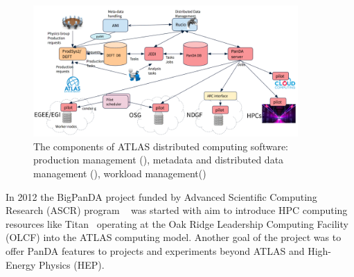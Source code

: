 \documentclass{webofc}
\begin{document}
\begin{itemize}
	
	
	
	
\end{itemize}

\begin{figure}
	\centering
	\includegraphics[width=0.90\textwidth]{figures/PanDA_architecture.png}
    \caption{The components of ATLAS distributed computing software: production management (), metadata and distributed data management (), workload management()}	
	\label{fig:panda-arch}
\end{figure}

In 2012 the BigPanDA project funded by Advanced Scientific Computing Research (ASCR) program ~\cite{DOEASCR} was started with aim to introduce HPC computing resources like Titan~\cite{Titan} operating at the Oak Ridge Leadership Computing Facility (OLCF) into the ATLAS computing model.
Another goal of the project was to offer PanDA features to projects and experiments beyond ATLAS and High-Energy Physics (HEP).

\end{document}
